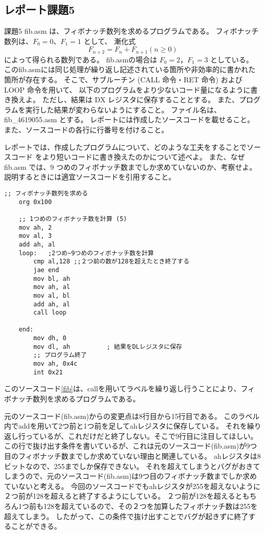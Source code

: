 \documentclass[12pt]{jarticle}
\begin{document}
\subsection{レポート課題5}
\begin{itembox}[l]{課題5}
	fib.asm は、フィボナッチ数列を求めるプログラムである。
	フィボナッチ数列は、$F_0 = 0$、$F_1 = 1$ として、
	漸化式
	$$F_{n+2} = F_n + F_{n+1}  (n \geq 0)$$
	によって得られる数列である。
	fib.asmの場合は $F_0 = 2$，$F_1 = 3$ としている。
	このfib.asmには同じ処理が繰り返し記述されている箇所や非効率的に書かれた箇所が存在する。
	そこで、サブルーチン (CALL 命令・RET 命令) および LOOP 命令を用いて、
	以下のプログラムをより少ないコード量になるように書き換えよ。
	ただし、結果は DX レジスタに保存することとする。
	また、プログラムを実行した結果が変わらないようにすること。
	ファイル名は、fib\_4619055.asm とする。
	レポートには作成したソースコードを載せること。
	また、ソースコードの各行に行番号を付けること。

	レポートでは、作成したプログラムについて、どのような工夫をすることでソースコード
	をより短いコードに書き換えたのかについて述べよ。
	また、なぜ fib.asm では、9 つめのフィボナッチ数までしか求めていないのか、考察せよ。
	説明するときには適宜ソースコードを引用すること。
\end{itembox}
\begin{lstlisting}[caption=fib\_4619055.asm,label=fib]
	;; フィボナッチ数列を求める
	org 0x100
	 
	;; 1つめのフィボナッチ数を計算 (5)
	mov ah, 2
	mov al, 3
	add ah, al
	loop:   ;2つめ~9つめのフィボナッチ数を計算
		cmp al,128 ;;２つ前の数が128を超えたとき終了する
		jae end
		mov bl, ah
		mov ah, al
		mov al, bl
		add ah, al
		call loop
	 
	end:
		mov dh, 0
		mov dl, ah          ; 結果をDLレジスタに保存
		;; プログラム終了
		mov ah, 0x4c
		int 0x21
\end{lstlisting}

\clearpage

このソースコード\ref{fib}は、callを用いてラベルを繰り返し行うことにより、フィボナッチ数列を求めるプログラムである。

元のソースコード(fib.asm)からの変更点は8行目から15行目である。
このラベル内でaddを用いて2つ前と1つ前を足してahレジスタに保存している。
それを繰り返し行っているが、これだけだと終了しない。そこで9行目に注目してほしい。
この行で抜け出す条件を書いているが、これは元のソースコード(fib.asm)が9つ目のフィボナッチ数までしか求めていない理由と関連している。
ahレジスタは8ビットなので、255までしか保存できない。
それを超えてしまうとバグがおきてしまうので、元のソースコード(fib.asm)は9つ目のフィボナッチ数までしか求めていないと考える。
今回のソースコードでもahレジスタが255を超えないように２つ前が128を超えると終了するようにしている。
２つ前が128を超えるともちろん1つ前も128を超えているので、その２つを加算したフィボナッチ数は255を超えてしまう。
したがって、この条件で抜け出すことでバグが起きずに終了することができる。
\end{document}
